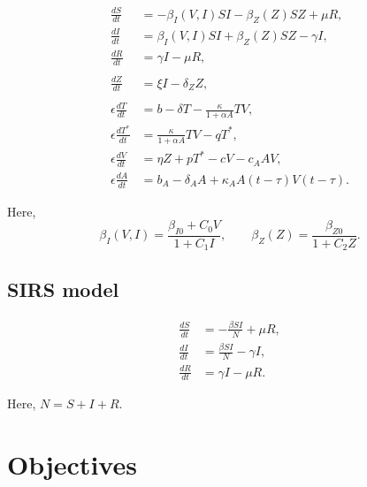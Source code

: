 \documentclass[11pt]{article}
\begin{document}
    \begin{align}
        \frac{dS}{dt} &= -\beta_I(V, I) SI - \beta_Z(Z) SZ + \mu R, \\
        \frac{dI}{dt} &= \beta_I(V, I) SI + \beta_Z(Z) SZ - \gamma I, \\
        \frac{dR}{dt} &= \gamma I - \mu R, \\\\
        \frac{dZ}{dt} &= \xi I - \delta_Z Z, \\\\
        \epsilon \frac{dT}{dt} &= b -  \delta T - \frac{\kappa}{1 + \alpha A} TV, \\
        \epsilon \frac{dT^*}{dt} &= \frac{\kappa}{1 + \alpha A} TV - qT^*, \\
        \epsilon \frac{dV}{dt} &= \eta Z + pT^* - cV - c_A AV, \\
        \epsilon \frac{dA}{dt} &= b_A -  \delta_A A + \kappa_A A(t - \tau)V(t - \tau).
    \end{align}

    Here, \[
        \beta_I(V, I) = \frac{\beta_{I0} + C_0 V}{1 + C_1 I}, \qquad
        \beta_Z(Z) = \frac{\beta_{Z0}}{1 + C_2 Z}.
    \]


    \subsection{SIRS model}

    \begin{align}
        \frac{dS}{dt} &= -\frac{\beta SI}{N} + \mu R, \\
        \frac{dI}{dt} &= \frac{\beta SI}{N} - \gamma I, \\
        \frac{dR}{dt} &= \gamma I - \mu R.
    \end{align}

    Here, $N = S + I + R$.


    \section{Objectives}
\end{document}
